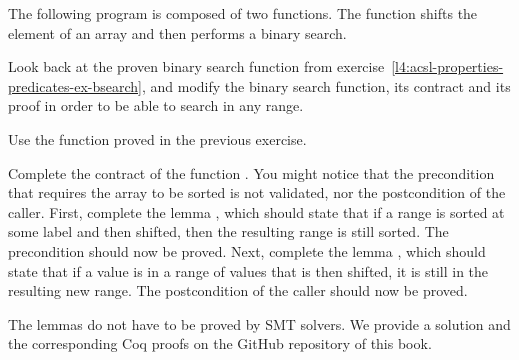 

The following program is composed of two functions. The function
 shifts the element of an array and then
performs a binary search.




Look back at the proven binary search function from
exercise~\ref{l4:acsl-properties-predicates-ex-bsearch}, and modify the binary
search function, its contract and its proof in order to be able to search in
any range.


Use the  function proved in the previous exercise.


Complete the contract of the function . You might
notice that the precondition that requires the array to be sorted is not
validated, nor the postcondition of the caller. First, complete the lemma
, which should state that if a range is sorted
at some label and then shifted, then the resulting range is still sorted. The
precondition should now be proved. Next, complete the lemma
, which should state that if a value is in a range
of values that is then shifted, it is still in the resulting new range. The
postcondition of the caller should now be proved.


The lemmas do not have to be proved by SMT solvers. We provide a solution and
the corresponding Coq proofs on the GitHub repository of this book.

